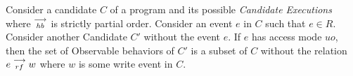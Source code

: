 \begin{theorem}
    \label{ReadElim}
    Consider a candidate $C$ of a program and its possible \textit{Candidate Executions} where $\stackrel{\longrightarrow}{_\textit{hb}}$ is strictly partial order. Consider an event $e$ in $C$ such that $e \in R$. 
    Consider another Candidate $C'$ without the event $e$. 
    If $e$ has access mode $uo$, then the set of Observable behaviors of $C'$ is a subset of $C$ without the relation $e\stackrel{\longrightarrow}{_{rf}}w$ where $w$ is some write event in $C$.   
\end{theorem}